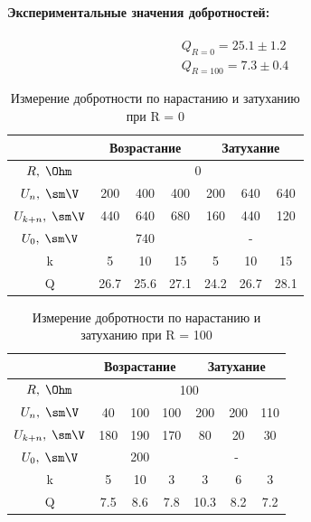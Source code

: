 \documentclass{../lab_class}
\begin{document}
\paragraph*{Экспериментальные значения добротностей:}
\begin{gather*}
Q_{R=0} = 25.1 \pm 1.2 \\
Q_{R=100} = 7.3 \pm 0.4
\end{gather*}

\begin{table}[H]
\centering
\begin{tabular}{|c|c|c|c|c|c|c|}
\hline
                    & \multicolumn{3}{c|}{Возрастание} & \multicolumn{3}{c|}{Затухание} \\ \hline
$R, \; \Ohm$        & \multicolumn{6}{c|}{0} \\ \hline
$U_{n}, \; \sm \V$  & 200    & 400    & 400     & 200    & 640   & 640 \\ \hline
$U_{k+n},\; \sm \V$ & 440    & 640    & 680     & 160    & 440   & 120  \\ \hline
$U_0, \; \sm \V$    & \multicolumn{3}{c|}{740}  & \multicolumn{3}{c|}{-} \\ \hline
k                   & 5      & 10     & 15      & 5       & 10    & 15    \\ \hline
Q                   & 26.7   & 25.6   & 27.1    & 24.2    & 26.7    & 28.1    \\ \hline
\end{tabular}
\caption{Измерение добротности по нарастанию и затуханию при R = 0 \Ohm}
\end{table}

\begin{table}[H]
\centering
\begin{tabular}{|c|c|c|c|c|c|c|}
\hline
                    & \multicolumn{3}{c|}{Возрастание} & \multicolumn{3}{c|}{Затухание} \\ \hline
$R, \; \Ohm$        & \multicolumn{6}{c|}{100} \\ \hline
$U_{n}, \; \sm \V$  & 40    & 100    & 100     & 200    & 200   & 110 \\ \hline
$U_{k+n},\; \sm \V$ & 180    & 190    & 170     & 80    & 20   & 30  \\ \hline
$U_0, \; \sm \V$    & \multicolumn{3}{c|}{200}  & \multicolumn{3}{c|}{-} \\ \hline
k                   & 5      & 10     & 3      & 3       & 6    & 3    \\ \hline
Q                   & 7.5   & 8.6   & 7.8    & 10.3      & 8.2    & 7.2    \\ \hline
\end{tabular}
\caption{Измерение добротности по нарастанию и затуханию при R = 100 \Ohm}
\end{table}
\end{document}
